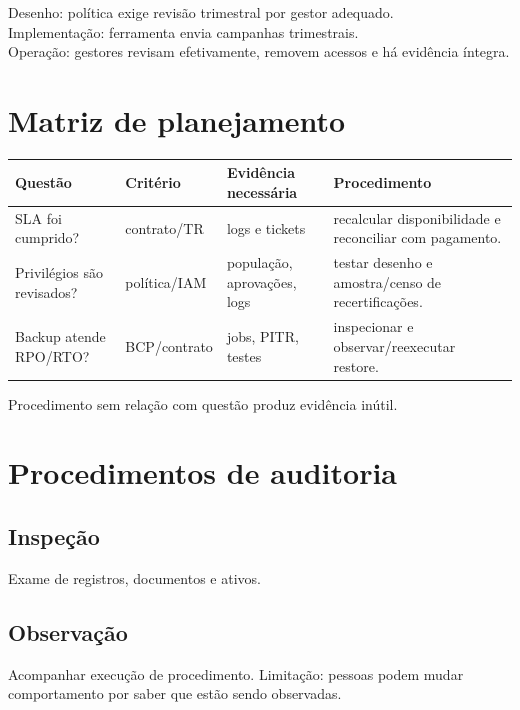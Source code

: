 \begin{exemplo}
Desenho: política exige revisão trimestral por gestor adequado.\\
Implementação: ferramenta envia campanhas trimestrais.\\
Operação: gestores revisam efetivamente, removem acessos e há evidência íntegra.
\end{exemplo}

\section{Matriz de planejamento}

\begin{table}[ht]
\centering
\small
\begin{tabularx}{\textwidth}{X X X X}
\toprule
Questão & Critério & Evidência necessária & Procedimento \\
\midrule
SLA foi cumprido? & contrato/TR & logs e tickets & recalcular disponibilidade e reconciliar com pagamento. \\
Privilégios são revisados? & política/IAM & população, aprovações, logs & testar desenho e amostra/censo de recertificações. \\
Backup atende RPO/RTO? & BCP/contrato & jobs, PITR, testes & inspecionar e observar/reexecutar restore. \\
\bottomrule
\end{tabularx}
\end{table}

Procedimento sem relação com questão produz evidência inútil.

\section{Procedimentos de auditoria}

\subsection{Inspeção}

Exame de registros, documentos e ativos.

\subsection{Observação}

Acompanhar execução de procedimento. Limitação: pessoas podem mudar comportamento por saber que estão sendo observadas.


